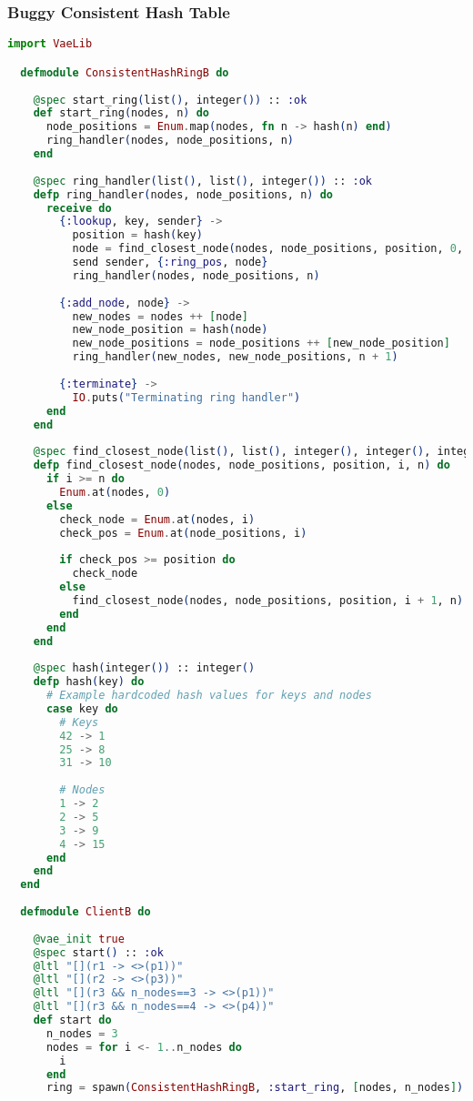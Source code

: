 \subsubsection{Buggy Consistent Hash Table}
\begin{lstlisting}[language=Elixir, xleftmargin=.1\linewidth]
  import VaeLib

  defmodule ConsistentHashRingB do
  
    @spec start_ring(list(), integer()) :: :ok
    def start_ring(nodes, n) do
      node_positions = Enum.map(nodes, fn n -> hash(n) end)
      ring_handler(nodes, node_positions, n)
    end
  
    @spec ring_handler(list(), list(), integer()) :: :ok
    defp ring_handler(nodes, node_positions, n) do
      receive do
        {:lookup, key, sender} ->
          position = hash(key)
          node = find_closest_node(nodes, node_positions, position, 0, n)
          send sender, {:ring_pos, node}
          ring_handler(nodes, node_positions, n)
  
        {:add_node, node} ->
          new_nodes = nodes ++ [node]
          new_node_position = hash(node)
          new_node_positions = node_positions ++ [new_node_position]
          ring_handler(new_nodes, new_node_positions, n + 1)
  
        {:terminate} ->
          IO.puts("Terminating ring handler")
      end
    end
  
    @spec find_closest_node(list(), list(), integer(), integer(), integer()) :: integer()
    defp find_closest_node(nodes, node_positions, position, i, n) do
      if i >= n do
        Enum.at(nodes, 0)
      else
        check_node = Enum.at(nodes, i)
        check_pos = Enum.at(node_positions, i)
  
        if check_pos >= position do
          check_node
        else
          find_closest_node(nodes, node_positions, position, i + 1, n)
        end
      end
    end
  
    @spec hash(integer()) :: integer()
    defp hash(key) do
      # Example hardcoded hash values for keys and nodes
      case key do
        # Keys
        42 -> 1
        25 -> 8
        31 -> 10
  
        # Nodes
        1 -> 2
        2 -> 5
        3 -> 9
        4 -> 15
      end
    end
  end
  
  defmodule ClientB do
  
    @vae_init true
    @spec start() :: :ok
    @ltl "[](r1 -> <>(p1))"
    @ltl "[](r2 -> <>(p3))"
    @ltl "[](r3 && n_nodes==3 -> <>(p1))"
    @ltl "[](r3 && n_nodes==4 -> <>(p4))"
    def start do
      n_nodes = 3
      nodes = for i <- 1..n_nodes do
        i
      end
      ring = spawn(ConsistentHashRingB, :start_ring, [nodes, n_nodes])
  

\end{lstlisting}

